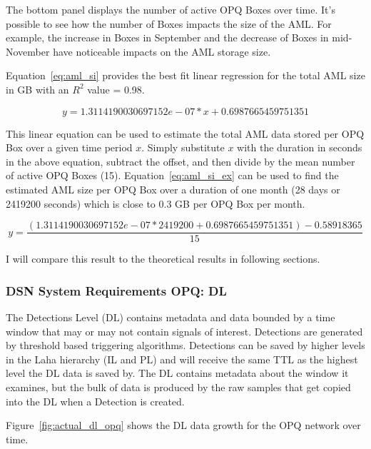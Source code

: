 The bottom panel displays the number of active OPQ Boxes over time. It's possible to see how the number of Boxes impacts the size of the AML. For example, the increase in Boxes in September and the decrease of Boxes in mid-November have noticeable impacts on the AML storage size.

Equation~\ref{eq:aml_si} provides the best fit linear regression for the total AML size in GB with an $R^2$ value = 0.98.

\begin{equation}
    y = 1.3114190030697152e-07 * x + 0.6987665459751351
    \label{eq:aml_si}
\end{equation}

This linear equation can be used to estimate the total AML data stored per OPQ Box over a given time period $x$. Simply substitute $x$ with the duration in seconds in the above equation, subtract the offset, and then divide by the mean number of active OPQ Boxes (15). Equation~\ref{eq:aml_si_ex} can be used to find the estimated AML size per OPQ Box over a duration of one month (28 days or 2419200 seconds) which is close to 0.3 GB per OPQ Box per month.

\begin{equation}
    y = \frac{(1.3114190030697152e-07 * 2419200 + 0.6987665459751351) - 0.58918365}{15}
    \label{eq:aml_si_ex}
\end{equation}

I will compare this result to the theoretical results in following sections.

\subsubsection{DSN System Requirements OPQ: DL}

The Detections Level (DL) contains metadata and data bounded by a time window that may or may not contain signals of interest. Detections are generated by threshold based triggering algorithms. Detections can be saved by higher levels in the Laha hierarchy (IL and PL) and will receive the same TTL as the highest level the DL data is saved by. The DL contains metadata about the window it examines, but the bulk of data is produced by the raw samples that get copied into the DL when a Detection is created.

Figure~\ref{fig:actual_dl_opq} shows the DL data growth for the OPQ network over time.

